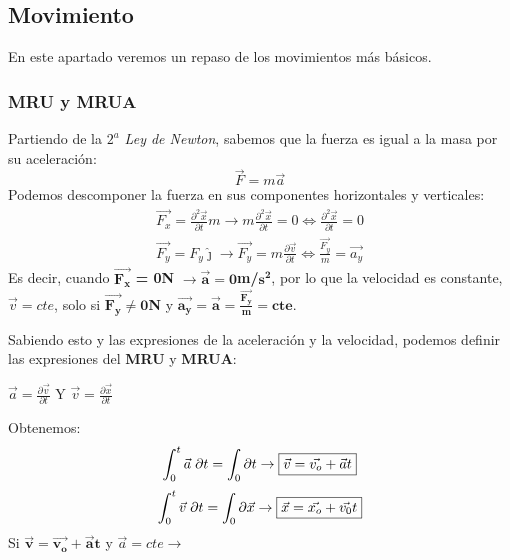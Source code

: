 \subsection{Movimiento}
\noindent En este apartado veremos un repaso de los movimientos más básicos.


\subsubsection{MRU y MRUA}

\noindent Partiendo de la \textit{\(2^a\) Ley de Newton}, sabemos que la fuerza es igual a la masa por su aceleración:
\[\vec{F} = m\vec{a}\]
Podemos descomponer la fuerza en sus componentes horizontales y verticales:
\begin{align*}
        \vec{F_{x}}=\frac{\partial^{2}\vec{x}}{\partial{t}}m
        \to
        m\frac{\partial^2 \vec{x}}{\partial t} = 0
        \Leftrightarrow
        \frac{\partial^2{\vec{x}}}{\partial{t}} = 0
        \\
        \vec{F_{y}}=F_{y}\hat{\jmath}
        \to
        \vec{F_y} = m\frac{\partial\vec{v}}{\partial t}\Leftrightarrow
        \frac{\vec{F_y}}{m} = \vec{a_y}
\end{align*}
Es decir, cuando \(\bm{\vec{F_x}}\)\textbf{ = 0N} \(\bm{\to\vec{a}=0}\)\textbf{m/}\(\bm{s^2}\), por lo que la velocidad es constante, \(\vec{v}=cte\), solo si \(\bm{\vec{F_y}\neq 0}\)\textbf{N} y \(\bm{\vec{a_y} = \vec{a} = \frac{\vec{F_y}}{m}=cte}\).\par \vspace{0.5cm} \noindent Sabiendo esto y las expresiones de la aceleración y la velocidad, podemos definir las expresiones del \textbf{MRU} y \textbf{MRUA}: \par \vspace{0.5cm} \hspace{5cm}
\( \vec{a} = \frac{\partial \vec{v} }{\partial t}\) Y \( \vec{v} = \frac{\partial \vec{x} }{\partial t}\) \par \vspace{0.5cm} Obtenemos:
\[
        \int_{0}^{t}{\vec{a}\hspace{1mm}\partial{t}} = \int_{0}\partial{t}
        \to
        \boxed{\vec{v} = \vec{v_o} + \vec{a}t}
\]
\[
        \int_{0}^{t}{\vec{v}\hspace{1mm}\partial{t}} = \int_{0}{\partial{\vec{x}}}
        \to
        \boxed{\vec{x} = \vec{x_o} + \vec{v_0}t}
\]
\hspace{2.3cm} Si \( \bm{\vec{v} = \vec{v_o} + \vec{a}t}\)
y
\( \vec{a} = cte \to\) 

